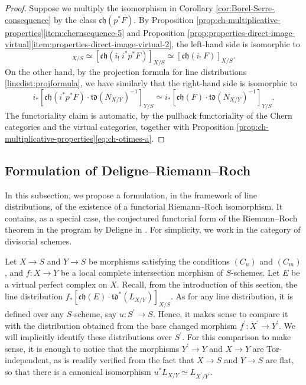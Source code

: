\documentclass[JEP,XML,SOM,Unicode,published]{cedram}
\theoremstyle{plain}
\theoremstyle{definition}
\newcommand{\Ocal}{\mathcal O}
\newcommand{\chfrak}{\mathfrak {ch}}
\newcommand{\tdfrak}{\mathfrak {td}}
\begin{document}
\begin{proof}
Suppose we multiply the isomorphism in Corollary \ref{cor:Borel-Serre-consequence} by the class $\chfrak(p^\ast F)$. By Proposition \ref{prop:ch-multiplicative-properties}\eqref{item:chernsequence-5} and Proposition \ref{prop:properties-direct-image-virtual}\eqref{item:properties-direct-image-virtual-2}, the left-hand side is isomorphic to\vspace*{-3pt}
\begin{displaymath}
[\chfrak(p^\ast F \otimes i_!\ \Ocal_X)]_{X/S} \simeq [\chfrak(i_!\ i^\ast p^\ast F)]_{X/S} \simeq [\chfrak(i_!\ F)]_{X/S}.
\end{displaymath}
On the other hand, by the projection formula for line distributions \eqref{linedist:projformula}, we have similarly that the right-hand side is isomorphic to\vspace*{-3pt}
\begin{displaymath}
i_\ast [\chfrak(i^\ast p^\ast F) \cdot \tdfrak(N_{X/Y})^{-1}]_{Y/S} \simeq i_\ast [\chfrak(F) \cdot \tdfrak(N_{X/Y})^{-1}]_{Y/S}.
\end{displaymath}
The functoriality claim is automatic, by the pullback functoriality of the Chern categories and the virtual categories, together with Proposition \ref{prop:ch-multiplicative-properties}\eqref{eq:ch-otimes-a}.
\end{proof}
\subsection{Formulation of Deligne--Riemann--Roch}\label{subsec:FormDRR}
In this subsection, we propose a formulation, in the framework of line distributions, of the existence of a functorial Riemann--Roch isomorphism. It contains, as a special case, the conjectured functorial form of the Riemann--Roch theorem in the program by Deligne in \cite{Deligne-determinant}. For simplicity, we work in the category of divisorial schemes.

Let $X\to S$ and $Y\to S$ be morphisms satisfying the conditions $(C_{n})$ and $(C_{m})$, and $f\colon X\to Y$ be a local complete intersection morphism of $S$-schemes. Let $E$ be a virtual perfect complex on $X$. Recall, from the introduction of this section, the line distribution $f_{\ast}[\chfrak(E)\cdot\tdfrak^{\ast}(L_{X/Y})]_{X/S}$. As for any line distribution, it is defined over any $S$-scheme, say $u: S^{\prime}\to S$. Hence, it makes sense to compare it with the distribution obtained from the base changed morphism $f^{\prime}: X^{\prime} \to Y^{\prime}$. We will implicitly identify these distributions over $S^{\prime}$. For this comparison to make sense, it is enough to notice that the morphisms $Y^{\prime} \to Y$ and $X \to Y$ are Tor-independent, as is readily verified from the fact that $X \to S$ and $Y \to S$ are flat, so that there is a canonical isomorphism $u^{\ast} L_{X/Y} \simeq L_{X^{\prime}/Y^{\prime} }$.
\end{document}

